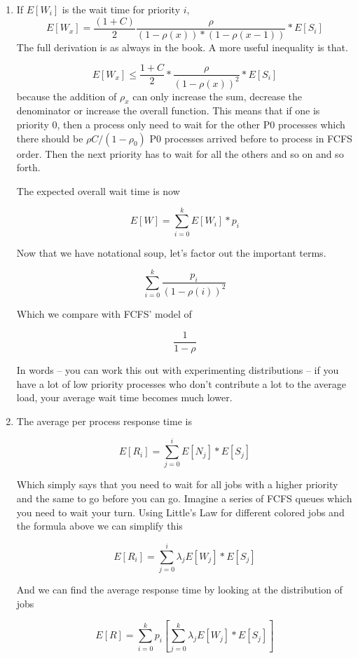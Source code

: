 \begin{enumerate}
\item If $E[W_i]$ is the wait time for priority $i$,
  \[
  E[W_x] = \frac{(1 + C)}{2}\frac{\rho}{(1 - \rho(x))*( 1 - \rho(x-1))} * E[S_i]
  \]
    The full derivation is as always in the book.
    A more useful inequality is that.

    \[
    E[W_x] \leq \frac{1 + C}{2}* \frac{\rho}{(1 - \rho(x))^2} * E[S_i]
    \]
    because the addition of $\rho_x$ can only increase the sum, decrease the denominator or increase the overall function.
  This means that if one is priority 0, then a process only need to wait for the other P0 processes which there should be $\rho C/ (1 - \rho_0)$ P0 processes arrived before to process in FCFS order.
  Then the next priority has to wait for all the others and so on and so forth.

  The expected overall wait time is now

  \[
      E[W] = \sum\limits_{i=0}^k E[W_i] * p_i
  \]

  Now that we have notational soup, let's factor out the important terms.

  \[
      \sum\limits_{i=0}^k \frac{p_i}{(1-\rho(i))^2}
  \]

  Which we compare with FCFS' model of

  \[
      \frac{1}{1-\rho}
  \]

  In words -- you can work this out with experimenting distributions -- if you have a lot of low priority processes who don't contribute a lot to the average load, your average wait time becomes much lower.

\item The average per process response time is

  \[
  E[R_i] = \sum\limits_{j = 0}^i E[N_j] * E[S_j]
  \]

  Which simply says that you need to wait for all jobs with a higher priority and the same to go before you can go.
  Imagine a series of FCFS queues which you need to wait your turn.
  Using Little's Law for different colored jobs and the formula above we can simplify this

  \[
      E[R_i] = \sum\limits_{j=0}^i \lambda_j E[W_j] * E[S_j]
  \]

  And we can find the average response time by looking at the distribution of jobs

  \[
      E[R] = \sum\limits_{i=0}^k p_i [\sum\limits_{j=0}^k \lambda_j E[W_j] * E[S_j] ]
  \]


\end{enumerate}
